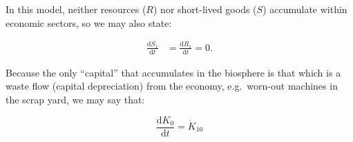 
In this model, neither resources ($R$) 
nor short-lived goods ($S$) accumulate within economic sectors, so we may also state:

\begin{align}\label{eq:A-dS_1/dt_zero}
	\frac{\mathrm{d}S_1}{\mathrm{d}t}		&
	= \frac{\mathrm{d}R_1}{\mathrm{d}t}
	= 0.
\end{align}




Because the only ``capital'' that accumulates 
in the biosphere
is that which is a waste flow 
(capital depreciation)
from the economy,
e.g.\ worn-out machines in the scrap yard,
we may say that:

\begin{equation} \label{eq:A_K0_balance}
	\frac{\mathrm{d}K_{0}}{\mathrm{d}t}		
	= \dot{K}_{10}
\end{equation}


